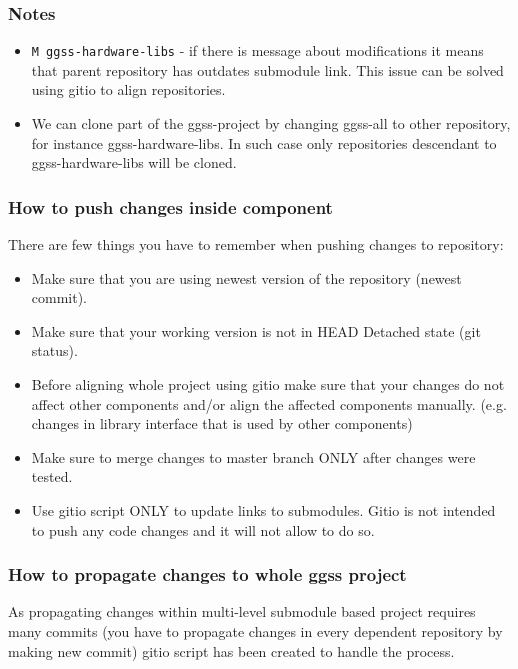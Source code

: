 \subsubsection*{Notes}
\begin{itemize}
    \item \lstinline{M ggss-hardware-libs} - if there is message about modifications it means that parent repository has outdates submodule link. This issue can be solved using gitio to align repositories.
    \item We can clone part of the ggss-project by changing ggss-all to other repository, for instance ggss-hardware-libs. In such case only repositories descendant to ggss-hardware-libs will be cloned.
\end{itemize}

\subsubsection*{How to push changes inside component}
There are few things you have to remember when pushing changes to repository:
\begin{itemize}
    \item Make sure that you are using newest version of the repository (newest commit).
    \item Make sure that your working version is not in HEAD Detached state (git status).
    \item Before aligning whole project using gitio make sure that your changes do not affect other components and/or align the affected components manually. (e.g. changes in library interface that is used by other components)
    \item Make sure to merge changes to master branch ONLY after changes were tested.
    \item Use gitio script ONLY to update links to submodules. Gitio is not intended to push any code changes and it will not allow to do so.
\end{itemize}

\subsubsection*{How to propagate changes to whole ggss project}

As propagating changes within multi-level submodule based project requires many commits (you have to propagate changes in every dependent repository by making new commit) gitio script has been created to handle the process.

